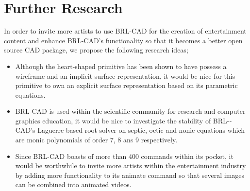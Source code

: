 
\section{Further Research}

\hspace{30} In   order   to   invite   more   artists   to   use   BRL-­CAD   for   the   creation   of  
entertainment   content   and   enhance   BRL-­CAD's   functionality   so   that   it   becomes  a 
better   open   source   CAD   package,   we   propose  the following research ideas;
\begin{itemize}
\item Although   the   heart-­shaped   primitive   has   been   shown   to   have   possess   a  
wireframe   and   an   implicit   surface   representation,   it   would   be   nice   for   this  
primitive   to   own   an   explicit   surface   representation   based   on   its   parametric  
equations.  
\item BRL­-CAD   is   used   within   the   scientific   community   for   research   and  
computer   graphics   education,   it   would   be   nice   to   investigate   the   stability  
of   BRL-­CAD's   Laguerre­-based   root   solver   on   septic,   octic   and   nonic  
equations which are monic polynomials of order 7, 8 ans 9 respectively.  
\item Since   BRL-­CAD   boasts   of   more   than   400   commands   within   its   pocket,   it  
would   be   worthwhile   to   invite   more   artists   within   the   entertainment   industry  
by   adding   more   functionality   to   its   animate   command   so   that   several  
images can be combined into animated videos.
\end{itemize}

\clearpage

